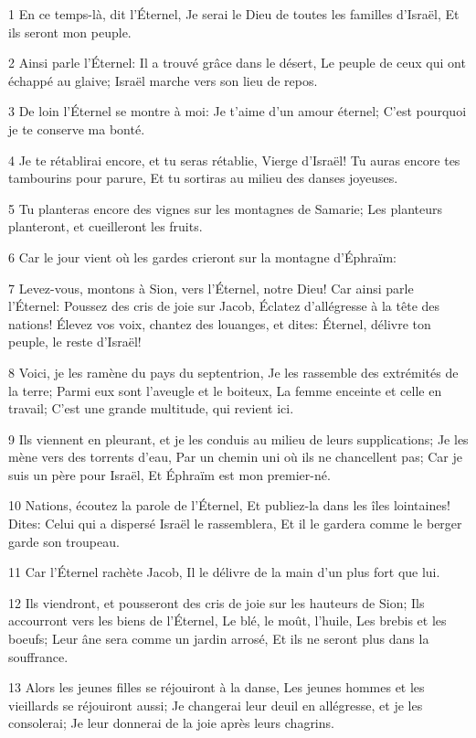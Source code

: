 \par 1 En ce temps-là, dit l'Éternel, Je serai le Dieu de toutes les familles d'Israël, Et ils seront mon peuple.
\par 2 Ainsi parle l'Éternel: Il a trouvé grâce dans le désert, Le peuple de ceux qui ont échappé au glaive; Israël marche vers son lieu de repos.
\par 3 De loin l'Éternel se montre à moi: Je t'aime d'un amour éternel; C'est pourquoi je te conserve ma bonté.
\par 4 Je te rétablirai encore, et tu seras rétablie, Vierge d'Israël! Tu auras encore tes tambourins pour parure, Et tu sortiras au milieu des danses joyeuses.
\par 5 Tu planteras encore des vignes sur les montagnes de Samarie; Les planteurs planteront, et cueilleront les fruits.
\par 6 Car le jour vient où les gardes crieront sur la montagne d'Éphraïm:
\par 7 Levez-vous, montons à Sion, vers l'Éternel, notre Dieu! Car ainsi parle l'Éternel: Poussez des cris de joie sur Jacob, Éclatez d'allégresse à la tête des nations! Élevez vos voix, chantez des louanges, et dites: Éternel, délivre ton peuple, le reste d'Israël!
\par 8 Voici, je les ramène du pays du septentrion, Je les rassemble des extrémités de la terre; Parmi eux sont l'aveugle et le boiteux, La femme enceinte et celle en travail; C'est une grande multitude, qui revient ici.
\par 9 Ils viennent en pleurant, et je les conduis au milieu de leurs supplications; Je les mène vers des torrents d'eau, Par un chemin uni où ils ne chancellent pas; Car je suis un père pour Israël, Et Éphraïm est mon premier-né.
\par 10 Nations, écoutez la parole de l'Éternel, Et publiez-la dans les îles lointaines! Dites: Celui qui a dispersé Israël le rassemblera, Et il le gardera comme le berger garde son troupeau.
\par 11 Car l'Éternel rachète Jacob, Il le délivre de la main d'un plus fort que lui.
\par 12 Ils viendront, et pousseront des cris de joie sur les hauteurs de Sion; Ils accourront vers les biens de l'Éternel, Le blé, le moût, l'huile, Les brebis et les boeufs; Leur âne sera comme un jardin arrosé, Et ils ne seront plus dans la souffrance.
\par 13 Alors les jeunes filles se réjouiront à la danse, Les jeunes hommes et les vieillards se réjouiront aussi; Je changerai leur deuil en allégresse, et je les consolerai; Je leur donnerai de la joie après leurs chagrins.
